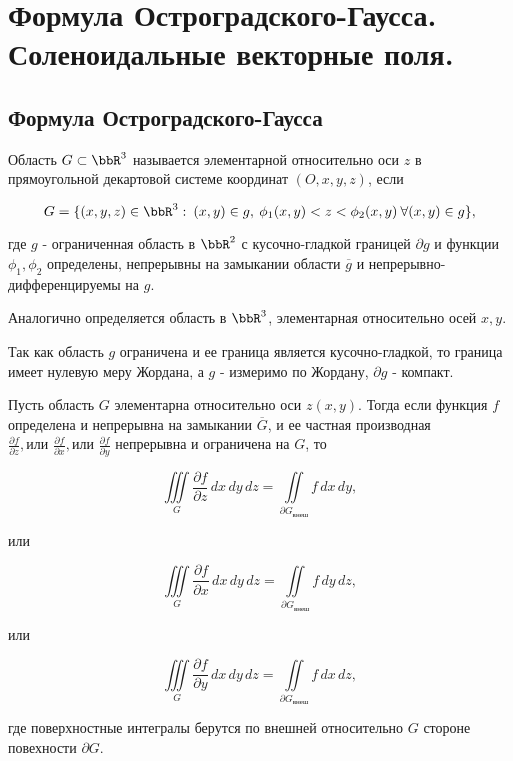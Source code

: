 \chapter{Формула Остроградского-Гаусса. Соленоидальные векторные поля.}
\section{Формула Остроградского-Гаусса}

\begin{defn}
Область $G \subset \bbR^3$ называется элементарной относительно оси $z$ в прямоугольной декартовой системе координат $(O, x, y, z)$, если 

\begin{equation} \label{ch15eq1}
G = \{ (x,y,z) \in \bbR^3: \: (x,y) \in g, \: \phi_1(x,y) < z < \phi_2(x,y) \: \forall (x,y) \in g\}, 
\end{equation}

где $g$ - ограниченная область в $\bbR^2$ с кусочно-гладкой границей $\partial g$ и функции $\phi_1, \phi_2$ определены, непрерывны на замыкании области $\overline{g}$ и непрерывно-дифференцируемы на $g$.
\end{defn}

Аналогично определяется область в $\bbR^3$, элементарная относительно осей $x,y$.

\begin{notion}
Так как область $g$ ограничена и ее граница является кусочно-гладкой, то граница имеет нулевую меру Жордана, а $g$ - измеримо по Жордану, $\partial g$ - компакт.
\end{notion}

\begin{lemm} \label{ch15lemm1}
Пусть область $G$ элементарна относительно оси $z(x,y)$. Тогда если функция $f$ определена и непрерывна на замыкании $\overline{G}$, и ее частная производная $\frac{\partial f}{\partial z}, \textit{или }\frac{\partial f}{\partial x}, \textit{или }\frac{\partial f}{\partial y}$ непрерывна и ограничена на $G$, то 

\begin{equation} \label{ch15eq2z}
\iiint\limits_{G} \frac{\partial f}{\partial z}\,dx\,dy\,dz = \iint\limits_{\partial	G_{\textit{внеш}}} f \,dx\,dy,
\end{equation}

или

\begin{equation} \label{ch15eq2x}
\iiint\limits_{G} \frac{\partial f}{\partial x}\,dx\,dy\,dz = \iint\limits_{\partial	G_{\textit{внеш}}} f \,dy\,dz,
\end{equation}

или

\begin{equation} \label{ch15eq2y}
\iiint\limits_{G} \frac{\partial f}{\partial y}\,dx\,dy\,dz = \iint\limits_{\partial	G_{\textit{внеш}}} f \,dx\,dz,
\end{equation}

где поверхностные интегралы берутся по внешней относительно $G$ стороне повехности $\partial G$.
\end{lemm}


